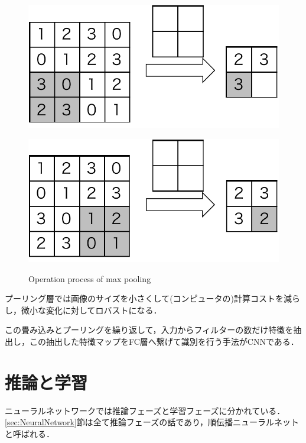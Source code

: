 \begin{figure}[H]
\begin{minipage}[b]{0.4\columnwidth}
		\subcaption{}
		\label{fig:pooling_ex2}
	\end{minipage}
	\begin{minipage}[b]{0.4\columnwidth}
		\centering
		\includegraphics[width=\linewidth]{figure/Review/pooling_ex3}
		\subcaption{}
		\label{fig:pooling_ex3}
	\end{minipage}
	\hspace{10truemm}
	\begin{minipage}[b]{0.4\columnwidth}
		\centering
		\includegraphics[width=\linewidth]{figure/Review/pooling_ex4}
		\subcaption{}
		\label{fig:pooling_ex4}
	\end{minipage}
	\caption{Operation process of max pooling}
	\label{fig:maxpooling}
\end{figure}

プーリング層では画像のサイズを小さくして(コンピュータの)計算コストを減らし，微小な変化に対してロバストになる．

この畳み込みとプーリングを繰り返して，入力からフィルターの数だけ特徴を抽出し，この抽出した特徴マップをFC層へ繋げて識別を行う手法がCNNである．


\section{推論と学習}
ニューラルネットワークでは推論フェーズと学習フェーズに分かれている．\ref{sec:NeuralNetwork}節は全て推論フェーズの話であり，順伝播ニューラルネットと呼ばれる．

